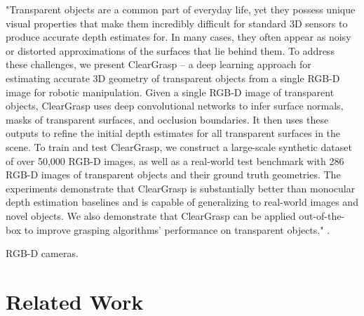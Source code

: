 "Transparent objects are a common part of everyday life, yet they possess unique visual properties that make them incredibly difficult for standard 3D sensors to produce accurate depth estimates for. In many cases, they often appear as noisy or distorted approximations of the surfaces that lie behind them. To address these challenges, we present ClearGrasp -- a deep learning approach for estimating accurate 3D geometry of transparent objects from a single RGB-D image for robotic manipulation. Given a single RGB-D image of transparent objects, ClearGrasp uses deep convolutional networks to infer surface normals, masks of transparent surfaces, and occlusion boundaries. It then uses these outputs to refine the initial depth estimates for all transparent surfaces in the scene. To train and test ClearGrasp, we construct a large-scale synthetic dataset of over 50,000 RGB-D images, as well as a real-world test benchmark with 286 RGB-D images of transparent objects and their ground truth geometries. The experiments demonstrate that ClearGrasp is substantially better than monocular depth estimation baselines and is capable of generalizing to real-world images and novel objects. We also demonstrate that ClearGrasp can be applied out-of-the-box to improve grasping algorithms' performance on transparent objects." \cite{sajjan2019cleargrasp}.

RGB-D cameras.

\section{Related Work}
\label{context:related-work} 







